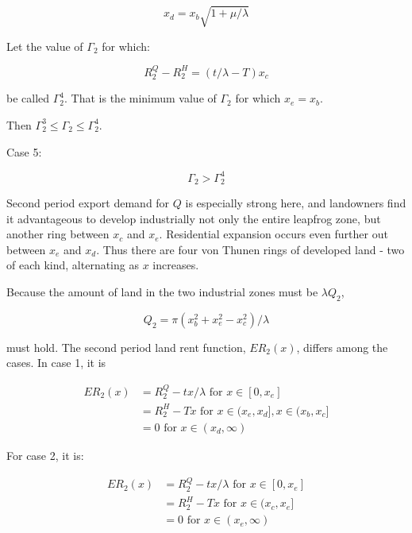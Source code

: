 \begin{equation*}
    x_d = x_b \sqrt{1 + \mu / \lambda}
\end{equation*}

Let the value of $\Gamma_2$ for which:

\begin{equation*}
    R_2^Q - R_2^H = (t / \lambda - T)x_c
\end{equation*}

be called $\Gamma_2^4$. That is the minimum value of $\Gamma_2$ for which $x_e = x_b$.

Then $\Gamma_2^3 \leq \Gamma_2 \leq \Gamma_2^4$.

Case 5:

\begin{equation*}
    \Gamma_2 > \Gamma_2^4
\end{equation*}

Second period export demand for $Q$ is especially strong here, and landowners find it advantageous to develop industrially not only the entire leapfrog zone, but another ring between $x_c$ and $x_e$. Residential expansion occurs even further out between $x_e$ and $x_d$. Thus there are four von Thunen rings of developed land - two of each kind, alternating as $x$ increases.

Because the amount of land in the two industrial zones must be $\lambda Q_2$,

\begin{equation}
    Q_2 = \pi (x_b^2 + x_e^2 - x_c^2) / \lambda
\end{equation}

must hold. The second period land rent function, $ER_2(x)$, differs among the cases. In case 1, it is

\begin{equation*}
    \begin{aligned}
        ER_2(x) & = R_2^Q - tx / \lambda \text{ for } x \in [0, x_e] \\
        & = R_2^H - Tx \text{ for } x \in (x_e, x_d], x \in (x_b, x_c] \\
        & = 0 \text{ for } x \in (x_d, \infty)
    \end{aligned}
\end{equation*}

For case 2, it is:

\begin{equation*}
    \begin{aligned}
        ER_2(x) & = R_2^Q - tx / \lambda \text{ for } x \in [0, x_e] \\
        & = R_2^H - Tx \text{ for } x \in (x_c, x_e] \\
        & = 0 \text{ for } x \in (x_e, \infty)
    \end{aligned}
\end{equation*}

